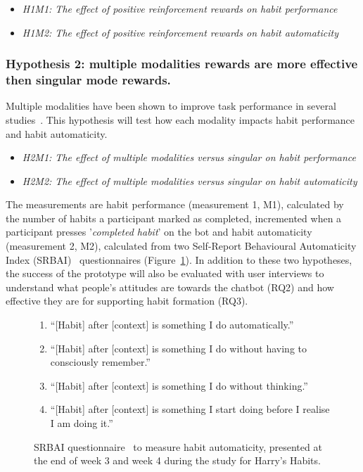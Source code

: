 \begin{itemize}
  \item \textit{H1M1: The effect of positive reinforcement rewards on habit performance}
  \item \textit{H1M2: The effect of positive reinforcement rewards on habit automaticity}
\end{itemize}

\subsubsection*{Hypothesis 2: multiple modalities rewards are more effective then singular mode rewards.}
Multiple modalities have been shown to improve task performance in several studies~\cite{comparing_modalities_effects_of_visual_auditory, benefits_of_audio_visual_1, benefits_of_audio_visual_2, chi_oussama_tap_the_shapetones}. This hypothesis will test how each modality impacts habit performance and habit automaticity.

\begin{itemize}
  \item \textit{H2M1: The effect of multiple modalities versus singular on habit performance}
  \item \textit{H2M2: The effect of multiple modalities versus singular on habit automaticity}
\end{itemize}

The measurements are habit performance (measurement 1, M1), calculated by the number of habits a participant marked as completed, incremented when a participant presses '\textit{completed habit}' on the bot and habit automaticity (measurement 2, M2), calculated from two Self-Report Behavioural Automaticity Index (SRBAI)~\cite{article_4q_SRBAI} questionnaires (Figure~\ref{fig:srbai_questionnaire}). In addition to these two hypotheses, the success of the prototype will also be evaluated with user interviews to understand what people's attitudes are towards the chatbot (RQ2) and how effective they are for supporting habit formation (RQ3).


\begin{figure}[H]
  \centering
  \begin{enumerate}
    \item ``[Habit] after [context] is something I do automatically.''
    \item ``[Habit] after [context] is something I do without having to consciously remember.''
    \item ``[Habit] after [context] is something I do without thinking.''
    \item ``[Habit] after [context]  is something I start doing before I realise I am doing it.''
  \end{enumerate}
  \caption{SRBAI questionnaire~\cite{article_4q_SRBAI} to measure habit automaticity, presented at the end of week 3 and week 4 during the study for Harry's Habits.}
  \label{fig:srbai_questionnaire}
\end{figure}


